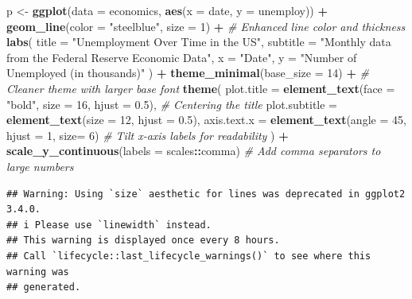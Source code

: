\documentclass[
]{article}
\newenvironment{Shaded}{\begin{snugshade}}{\end{snugshade}}
\newcommand{\AttributeTok}[1]{\textcolor[rgb]{0.13,0.29,0.53}{#1}}
\newcommand{\CommentTok}[1]{\textcolor[rgb]{0.56,0.35,0.01}{\textit{#1}}}
\newcommand{\DecValTok}[1]{\textcolor[rgb]{0.00,0.00,0.81}{#1}}
\newcommand{\FloatTok}[1]{\textcolor[rgb]{0.00,0.00,0.81}{#1}}
\newcommand{\FunctionTok}[1]{\textcolor[rgb]{0.13,0.29,0.53}{\textbf{#1}}}
\newcommand{\NormalTok}[1]{#1}
\newcommand{\OtherTok}[1]{\textcolor[rgb]{0.56,0.35,0.01}{#1}}
\newcommand{\SpecialCharTok}[1]{\textcolor[rgb]{0.81,0.36,0.00}{\textbf{#1}}}
\newcommand{\StringTok}[1]{\textcolor[rgb]{0.31,0.60,0.02}{#1}}
\begin{document}
\begin{Shaded}
\begin{Highlighting}[]
\NormalTok{p }\OtherTok{\textless{}{-}} \FunctionTok{ggplot}\NormalTok{(}\AttributeTok{data =}\NormalTok{ economics, }\FunctionTok{aes}\NormalTok{(}\AttributeTok{x =}\NormalTok{ date, }\AttributeTok{y =}\NormalTok{ unemploy)) }\SpecialCharTok{+}
  \FunctionTok{geom\_line}\NormalTok{(}\AttributeTok{color =} \StringTok{"steelblue"}\NormalTok{, }\AttributeTok{size =} \DecValTok{1}\NormalTok{) }\SpecialCharTok{+}  \CommentTok{\# Enhanced line color and thickness}
  \FunctionTok{labs}\NormalTok{(}
    \AttributeTok{title =} \StringTok{"Unemployment Over Time in the US"}\NormalTok{,}
    \AttributeTok{subtitle =} \StringTok{"Monthly data from the Federal Reserve Economic Data"}\NormalTok{,}
    \AttributeTok{x =} \StringTok{"Date"}\NormalTok{,}
    \AttributeTok{y =} \StringTok{"Number of Unemployed (in thousands)"}
\NormalTok{  ) }\SpecialCharTok{+}
  \FunctionTok{theme\_minimal}\NormalTok{(}\AttributeTok{base\_size =} \DecValTok{14}\NormalTok{) }\SpecialCharTok{+}  \CommentTok{\# Cleaner theme with larger base font}
  \FunctionTok{theme}\NormalTok{(}
    \AttributeTok{plot.title =} \FunctionTok{element\_text}\NormalTok{(}\AttributeTok{face =} \StringTok{"bold"}\NormalTok{, }\AttributeTok{size =} \DecValTok{16}\NormalTok{, }\AttributeTok{hjust =} \FloatTok{0.5}\NormalTok{),  }\CommentTok{\# Centering the title}
    \AttributeTok{plot.subtitle =} \FunctionTok{element\_text}\NormalTok{(}\AttributeTok{size =} \DecValTok{12}\NormalTok{, }\AttributeTok{hjust =} \FloatTok{0.5}\NormalTok{),}
    \AttributeTok{axis.text.x =} \FunctionTok{element\_text}\NormalTok{(}\AttributeTok{angle =} \DecValTok{45}\NormalTok{, }\AttributeTok{hjust =} \DecValTok{1}\NormalTok{, }\AttributeTok{size=} \DecValTok{6}\NormalTok{)  }\CommentTok{\# Tilt x{-}axis labels for readability}
\NormalTok{  ) }\SpecialCharTok{+}
  \FunctionTok{scale\_y\_continuous}\NormalTok{(}\AttributeTok{labels =}\NormalTok{ scales}\SpecialCharTok{::}\NormalTok{comma)  }\CommentTok{\# Add comma separators to large numbers}
\end{Highlighting}
\end{Shaded}

\begin{verbatim}
## Warning: Using `size` aesthetic for lines was deprecated in ggplot2 3.4.0.
## i Please use `linewidth` instead.
## This warning is displayed once every 8 hours.
## Call `lifecycle::last_lifecycle_warnings()` to see where this warning was
## generated.
\end{verbatim}
\end{document}
